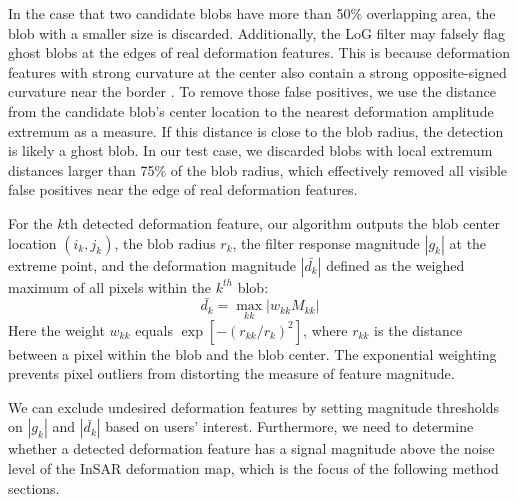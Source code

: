 \documentclass{utexasthesis}
\begin{document}
In the case that two candidate blobs have more than 50\% overlapping area, the blob with a smaller size is discarded. 
Additionally, the LoG filter may falsely flag ghost blobs at the edges of real deformation features. This is because deformation features with strong curvature at the center also contain a strong opposite-signed curvature near the border \citep{Lindeberg1998FeatureDetectionAutomatic}. To remove those false positives, we use the distance from the candidate blob's center location to the nearest deformation amplitude extremum as a measure. If this distance is close to the blob radius, the detection is likely a ghost blob. In our test case, we discarded blobs with local extremum distances larger than 75$\%$ of the blob radius, which effectively removed all visible false positives near the edge of real deformation features.

For the $k$th detected deformation feature, our algorithm outputs the blob center location $(i_k, j_k)$, the blob radius $ r_k$, the filter response magnitude $|g_k|$ at the extreme point, and the deformation magnitude $|\bar{d_k}|$ defined as the weighed maximum of all pixels within the $k^{th}$ blob:
\begin{equation}
\bar{d_k} = \max_{kk} |w_{kk} M_{kk} | 
\end{equation}
Here the weight $w_{kk}$ equals $\exp\left[-(r_{kk} / r_k)^2\right]$, where $r_{kk}$ is the distance between a pixel within the blob and the blob center. The exponential weighting prevents pixel outliers from distorting the measure of feature magnitude. 

We can exclude undesired deformation features by setting magnitude thresholds on $|g_k|$ and $|\bar{d_k}|$ based on users' interest. Furthermore, we need to determine whether a detected deformation feature has a signal magnitude above the noise level of the InSAR deformation map, which is the focus of the following method sections. 
\end{document}

